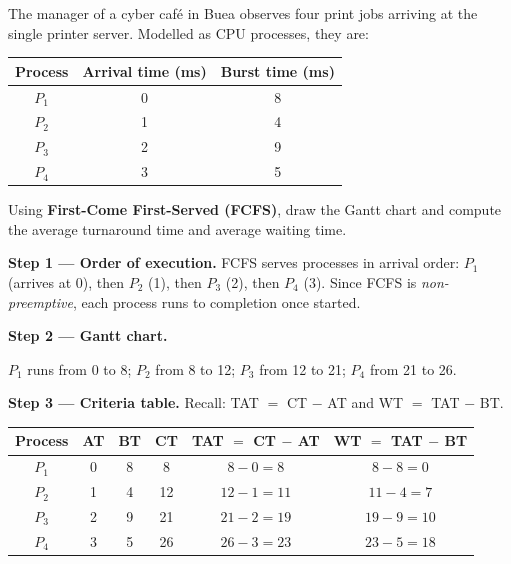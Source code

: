\documentclass[11pt]{article}
\newcommand{\legende}[1]{\par\vspace{6pt}{\popsemi\fontsize{9}{11.5}\selectfont\color{popmuted}#1}}
\begin{document}
\begin{exoresolu}
The manager of a cyber café in Buea observes four print jobs arriving at the single printer server. Modelled as CPU processes, they are:

\begin{center}
\begin{tabular}{|c|c|c|}
\hline
\rowcolor{popblueL} Process & Arrival time (ms) & Burst time (ms) \\
\hline
$P_1$ & 0 & 8 \\
\hline
$P_2$ & 1 & 4 \\
\hline
$P_3$ & 2 & 9 \\
\hline
$P_4$ & 3 & 5 \\
\hline
\end{tabular}
\end{center}

Using \textbf{First-Come First-Served (FCFS)}, draw the Gantt chart and compute the average turnaround time and average waiting time.

\tcblower
\textbf{Step 1 — Order of execution.} FCFS serves processes in arrival order: $P_1$ (arrives at 0), then $P_2$ (1), then $P_3$ (2), then $P_4$ (3). Since FCFS is \emph{non-preemptive}, each process runs to completion once started.

\textbf{Step 2 — Gantt chart.}

\begin{popfigure}
\begin{center}
\legende{Gantt chart for FCFS.}
\end{center}
\end{popfigure}

$P_1$ runs from 0 to 8; $P_2$ from 8 to 12; $P_3$ from 12 to 21; $P_4$ from 21 to 26.

\textbf{Step 3 — Criteria table.} Recall: TAT $=$ CT $-$ AT and WT $=$ TAT $-$ BT.

\begin{center}
\begin{tabular}{|c|c|c|c|c|c|}
\hline
\rowcolor{popblueL} Process & AT & BT & CT & TAT $=$ CT $-$ AT & WT $=$ TAT $-$ BT \\
\hline
$P_1$ & 0 & 8 & 8 & $8-0=8$ & $8-8=0$ \\
\hline
$P_2$ & 1 & 4 & 12 & $12-1=11$ & $11-4=7$ \\
\hline
$P_3$ & 2 & 9 & 21 & $21-2=19$ & $19-9=10$ \\
\hline
$P_4$ & 3 & 5 & 26 & $26-3=23$ & $23-5=18$ \\
\hline
\end{tabular}
\end{center}


\end{exoresolu}
\end{document}
